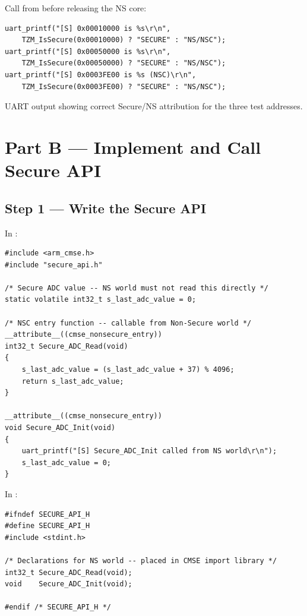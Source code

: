 \documentclass[11pt, a4paper]{article}
\begin{document}
Call from  before releasing the NS core:

\begin{lstlisting}[style=cstyle]
uart_printf("[S] 0x00010000 is %s\r\n",
    TZM_IsSecure(0x00010000) ? "SECURE" : "NS/NSC");
uart_printf("[S] 0x00050000 is %s\r\n",
    TZM_IsSecure(0x00050000) ? "SECURE" : "NS/NSC");
uart_printf("[S] 0x0003FE00 is %s (NSC)\r\n",
    TZM_IsSecure(0x0003FE00) ? "SECURE" : "NS/NSC");
\end{lstlisting}

\begin{checkpointbox}[~A]
  UART output showing correct Secure/NS attribution for the three test addresses.
\end{checkpointbox}

\section{Part B --- Implement and Call Secure API}

\subsection{Step 1 --- Write the Secure API}

In :

\begin{lstlisting}[style=cstyle]
#include <arm_cmse.h>
#include "secure_api.h"

/* Secure ADC value -- NS world must not read this directly */
static volatile int32_t s_last_adc_value = 0;

/* NSC entry function -- callable from Non-Secure world */
__attribute__((cmse_nonsecure_entry))
int32_t Secure_ADC_Read(void)
{
    s_last_adc_value = (s_last_adc_value + 37) % 4096;
    return s_last_adc_value;
}

__attribute__((cmse_nonsecure_entry))
void Secure_ADC_Init(void)
{
    uart_printf("[S] Secure_ADC_Init called from NS world\r\n");
    s_last_adc_value = 0;
}
\end{lstlisting}

In :

\begin{lstlisting}[style=cstyle]
#ifndef SECURE_API_H
#define SECURE_API_H
#include <stdint.h>

/* Declarations for NS world -- placed in CMSE import library */
int32_t Secure_ADC_Read(void);
void    Secure_ADC_Init(void);

#endif /* SECURE_API_H */
\end{lstlisting}
\end{document}
